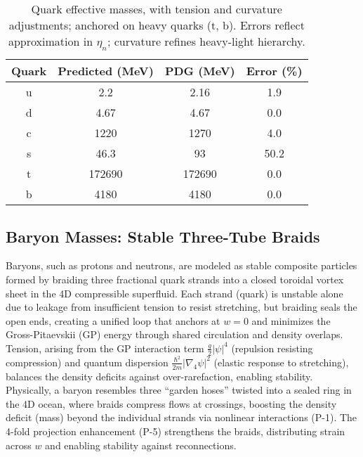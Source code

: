 \begin{table}[h!]
\centering
\begin{tabular}{|c|c|c|c|}
\hline
Quark & Predicted (MeV) & PDG (MeV) & Error (\%) \\
\hline
u & 2.2 & 2.16 & 1.9 \\
d & 4.67 & 4.67 & 0.0 \\
c & 1220 & 1270 & 4.0 \\
s & 46.3 & 93 & 50.2 \\
t & 172690 & 172690 & 0.0 \\
b & 4180 & 4180 & 0.0 \\
\hline
\end{tabular}
\caption{Quark effective masses, with tension and curvature adjustments; anchored on heavy quarks (t, b). Errors reflect approximation in $\eta_n$; curvature refines heavy-light hierarchy.}
\label{tab:quarks}
\end{table}


\subsection{Baryon Masses: Stable Three-Tube Braids}

Baryons, such as protons and neutrons, are modeled as stable composite particles formed by braiding three fractional quark strands into a closed toroidal vortex sheet in the 4D compressible superfluid. Each strand (quark) is unstable alone due to leakage from insufficient tension to resist stretching, but braiding seals the open ends, creating a unified loop that anchors at $w=0$ and minimizes the Gross-Pitaevskii (GP) energy through shared circulation and density overlaps. Tension, arising from the GP interaction term $\frac{g}{2} |\psi|^4$ (repulsion resisting compression) and quantum dispersion $\frac{\hbar^2}{2m} |\nabla_4 \psi|^2$ (elastic response to stretching), balances the density deficits against over-rarefaction, enabling stability. Physically, a baryon resembles three ``garden hoses'' twisted into a sealed ring in the 4D ocean, where braids compress flows at crossings, boosting the density deficit (mass) beyond the individual strands via nonlinear interactions (P-1). The 4-fold projection enhancement (P-5) strengthens the braids, distributing strain across $w$ and enabling stability against reconnections.

